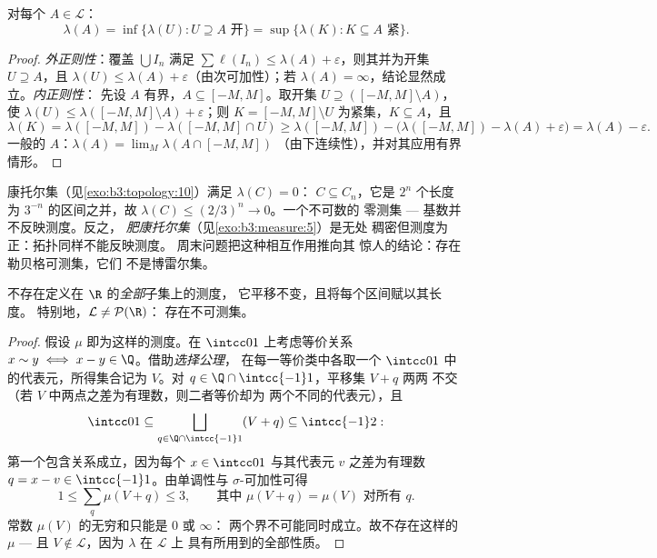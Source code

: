 \begin{theorem}[正则性]\label{thm:b3:measure:regularity}
对每个 $A \in \mathcal L$：
\[
\lambda(A) = \inf\{\lambda(U) : U \supseteq A \text{ 开}\}
= \sup\{\lambda(K) : K \subseteq A \text{ 紧}\}.
\]
\end{theorem}

\begin{proof}
\emph{外正则性}：覆盖 $\bigcup I_n$ 满足 $\sum\ell(I_n) \leq
\lambda(A) + \varepsilon$，则其并为开集 $U \supseteq A$，且
$\lambda(U) \leq \lambda(A) + \varepsilon$（由次可加性）；若
$\lambda(A) = \infty$，结论显然成立。\emph{内正则性}：
先设 $A$ 有界，$A \subseteq [-M, M]$。取开集
$U \supseteq ([-M,M]\setminus A)$，使 $\lambda(U) \leq
\lambda([-M,M]\setminus A) + \varepsilon$；则 $K = [-M,
M]\setminus U$ 为紧集，$K \subseteq A$，且
\[
\lambda(K) = \lambda([-M,M]) - \lambda([-M,M]\cap U)
\geq \lambda([-M,M]) - \bigl(\lambda([-M,M]) - \lambda(A) +
\varepsilon\bigr) = \lambda(A) - \varepsilon .
\]
一般的 $A$：$\lambda(A) = \lim_M\lambda(A\cap[-M,M])$
（由下连续性），并对其应用有界情形。
\end{proof}

\begin{example}\label{ex:b3:measure:cantor}
康托尔集（见\cref{exo:b3:topology:10}）满足 $\lambda(C) = 0$：
$C \subseteq C_n$，它是 $2^n$ 个长度为
$3^{-n}$ 的区间之并，故 $\lambda(C) \leq (2/3)^n \to 0$。一个不可数的
零测集 --- 基数并不反映测度。反之，
\emph{肥康托尔集}（见\cref{exo:b3:measure:5}）是无处
稠密但测度为正：拓扑同样不能反映测度。
周末问题把这种相互作用推向其
惊人的结论：存在勒贝格可测集，它们
不是博雷尔集。
\end{example}

\begin{theorem}[维塔利]\label{thm:b3:measure:vitali}
不存在定义在 $\R$ 的\emph{全部}子集上的测度，
它平移不变，且将每个区间赋以其长度。
特别地，$\mathcal L \neq \mathcal P(\R)$：
存在不可测集。
\end{theorem}

\begin{proof}
假设 $\mu$ 即为这样的测度。在 $\intcc01$ 上考虑等价关系
$x \sim y \iff x - y \in \Q$。借助\emph{选择公理}，
在每一等价类中各取一个 $\intcc01$ 中的代表元，所得集合记为 $V$。对
$q \in \Q\cap\intcc{-1}1$，平移集 $V + q$ 两两
不交（若 $V$ 中两点之差为有理数，则二者等价却为
两个不同的代表元），且
\[
\intcc01 \subseteq \bigsqcup_{q \in \Q\cap\intcc{-1}1}(V + q)
\subseteq \intcc{-1}2 :
\]
第一个包含关系成立，因为每个 $x \in \intcc01$ 与其代表元
$v$ 之差为有理数 $q = x - v \in
\intcc{-1}1$。由单调性与 $\sigma$-可加性可得
\[
1 \leq \sum_{q}\mu(V + q) \leq 3,
\qquad\text{其中 } \mu(V + q) = \mu(V) \text{ 对所有 } q .
\]
常数 $\mu(V)$ 的无穷和只能是 $0$ 或 $\infty$：
两个界不可能同时成立。故不存在这样的 $\mu$ --- 且 $V
\notin \mathcal L$，因为 $\lambda$ 在 $\mathcal L$ 上
具有所用到的全部性质。
\end{proof}

